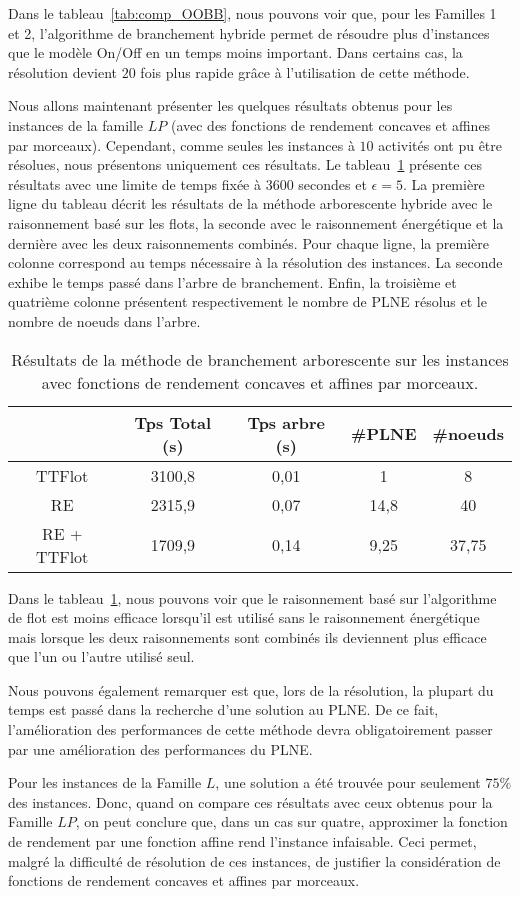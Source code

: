 Dans le tableau~\ref{tab:comp_OOBB}, nous pouvons voir que, pour les
Familles 1 et 2, l'algorithme de branchement hybride permet de
résoudre plus d'instances que le modèle On/Off en un temps moins
important. Dans certains cas, la résolution devient $20$ fois plus
rapide grâce à l'utilisation de cette méthode. 

Nous allons maintenant présenter les quelques résultats obtenus pour
les instances de la famille $LP$ (avec des fonctions de rendement
concaves et affines par morceaux). Cependant, comme seules les
instances à $10$ activités ont pu être résolues, nous présentons
uniquement ces résultats. Le tableau~\ref{tab:BB_LPM} présente
ces résultats avec une limite de temps fixée à $3600$ secondes et
$\epsilon=5$. La première ligne du tableau décrit les résultats de la
méthode arborescente hybride avec le raisonnement basé sur les flots,
la seconde avec le raisonnement énergétique et la dernière avec les
deux raisonnements combinés. Pour chaque ligne, la première colonne
correspond au temps nécessaire à la résolution des instances. La
seconde exhibe le temps passé dans l'arbre de branchement. Enfin, la
troisième et quatrième colonne présentent respectivement le nombre de
PLNE résolus et le nombre de noeuds dans l'arbre.


\begin{table}[!htb]
\centering 
\begin{tabular}{|c|cccc|}
\hline
 & Tps Total (s)  & Tps arbre (s) & \#PLNE & \#noeuds\\
\hline
TTFlot &3100,8 &0,01&	1	& 8\\
RE&2315,9&0,07&	14,8	&40\\
RE + TTFlot &1709,9&	0,14&	9,25	&37,75\\
\hline
\end{tabular}
\caption{Résultats de la méthode de branchement arborescente sur les
  instances avec fonctions de rendement concaves et affines par
  morceaux. }
\label{tab:BB_LPM}
\end{table}

Dans le tableau~\ref{tab:BB_LPM}, nous pouvons voir que le
raisonnement basé sur l'algorithme de flot est moins efficace
lorsqu'il est utilisé sans le raisonnement énergétique mais lorsque
les deux raisonnements sont combinés ils deviennent plus efficace que
l'un ou l'autre utilisé seul. 

Nous pouvons également remarquer est que, lors de la
résolution, la plupart du temps est passé dans la recherche d'une
solution au PLNE. De ce fait, l'amélioration des performances de cette
méthode devra obligatoirement passer par une amélioration des
performances du PLNE. 

Pour les instances de la Famille $L$, une solution a été trouvée pour
seulement $75\%$ des instances. Donc, quand on compare ces résultats
avec ceux obtenus pour la Famille $LP$, on peut conclure que, dans un
cas sur quatre, approximer la fonction de rendement par une fonction
affine rend l'instance infaisable. Ceci permet, malgré la difficulté
de résolution de ces instances, de justifier la considération de
fonctions de rendement concaves et affines par morceaux.




